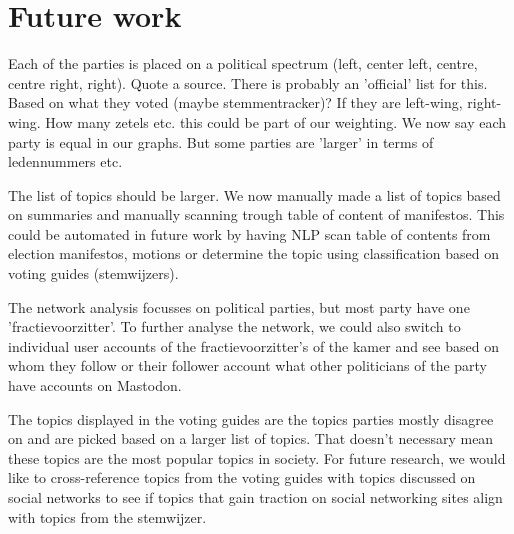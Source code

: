 \section{Future work}

Each of the parties is placed on a political spectrum (left, center left, centre, centre right, right). Quote a source.
There is probably an 'official' list for this.
Based on what they voted (maybe stemmentracker)? If they are left-wing, right-wing. How many zetels etc. this could be part of our weighting. We now say each party is equal in our graphs. But some parties are 'larger' in terms of ledennummers etc.

The list of topics should be larger.
We now manually made a list of topics based on summaries and manually scanning trough table of content of manifestos.
This could be automated in future work by having NLP scan table of contents from election manifestos, motions or determine the topic using classification based on voting guides (stemwijzers).

The network analysis focusses on political parties, but most party have one 'fractievoorzitter'.
To further analyse the network, we could also switch to individual user accounts of the fractievoorzitter's of the kamer and see based on whom they follow or their follower account what other politicians of the party have accounts on Mastodon.

The topics displayed in the voting guides are the topics parties mostly disagree on and are picked based on a larger list of topics. 
That doesn't necessary mean these topics are the most popular topics in society. 
For future research, we would like to cross-reference topics from the voting guides with topics discussed on social networks to see if topics that gain traction on social networking sites align with topics from the stemwijzer.